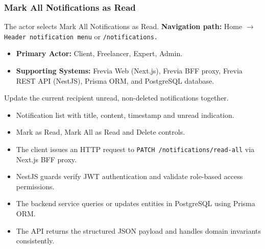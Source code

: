 \subsubsection{Mark All Notifications as Read}

The actor selects Mark All Notifications as Read.\newline
\textbf{Navigation path:} Home $\rightarrow$ \texttt{Header notification menu} or \texttt{/\allowbreak{}notifications.}


\begin{itemize}[leftmargin=1.6em,topsep=3pt,itemsep=2pt,parsep=0pt,label=$\bullet$]
    \item \textbf{Primary Actor:} Client, Freelancer, Expert, Admin.
    \item \textbf{Supporting Systems:} Frevia Web (Next.js), Frevia BFF proxy, Frevia REST API (NestJS), Prisma ORM, and PostgreSQL database.
\end{itemize}

\noindent Update the current recipient unread, non-deleted notifications together.

\begin{itemize}[leftmargin=1.6em,topsep=3pt,itemsep=2pt,parsep=0pt,label=$\bullet$]
    \item Notification list with title, content, timestamp and unread indication.
    \item Mark as Read, Mark All as Read and Delete controls.
\end{itemize}

\begin{itemize}[leftmargin=1.6em,topsep=3pt,itemsep=2pt,parsep=0pt,label=$\bullet$]
    \item The client issues an HTTP request to \texttt{PATCH /\allowbreak{}notifications/\allowbreak{}read-\allowbreak{}all} via Next.js BFF proxy.
    \item NestJS guards verify JWT authentication and validate role-based access permissions.
    \item The backend service queries or updates entities in PostgreSQL using Prisma ORM.
    \item The API returns the structured JSON payload and handles domain invariants consistently.
\end{itemize}

